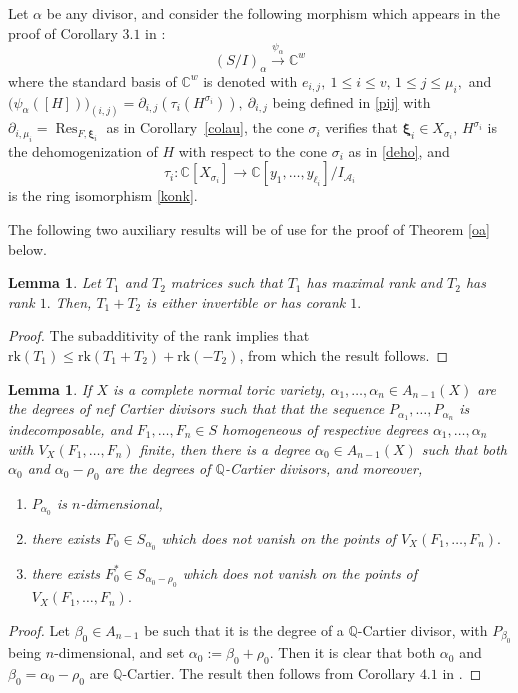 \documentclass[a4paper,11pt]{amsart}
\newcommand{\Res}{\operatorname{Res}}
\newcommand{\C}{\mathbb{C}}
\newcommand{\Q}{\mathbb{Q}}
\newcommand{\cA}{{\mathcal A}}
\newcommand{\bfxi}{{\boldsymbol{\xi}}}
\newcounter{thm}
\numberwithin{thm}{section}
\numberwithin{equation}{section}
\theoremstyle{definition}
\theoremstyle{plain}
\newtheorem{lemma}[thm]{Lemma}
\begin{document}
Let $\alpha$ be any divisor, and consider the following morphism which appears in the proof of Corollary $3.1$ in \cite{BT22}:
\begin{equation}\label{square}
 (S/I)_{\alpha}  \stackrel{\psi_\alpha}{\longrightarrow}
\C^w 
\end{equation}
where the standard basis of  $\C^w$ is denoted with $e_{i,j},\ 1\leq i\leq v,\, 1\leq j\leq \mu_i,$  and $\big(\psi_{\alpha}([H])\big)_{(i,j)}=\partial_{i,j}(\tau_i(H^{\sigma_ i})),\ \partial_{i,j}$ being defined in \eqref{pij} with $\partial_{i, \mu_i} = \Res_{F,\bfxi_i}$ as in Corollary~\ref{colau}, the cone $\sigma_i$ verifies that $\bfxi_i\in X_{\sigma_i},\, H^{\sigma_i}$ is the dehomogenization of $H$ with respect to the cone $\sigma_i$ as in \eqref{deho}, and
\begin{equation}\label{taui}
\tau_i:\C[X_{\sigma_i}]\to\C[y_1,\ldots, y_{\ell_i}]/ I_{\cA_i}
\end{equation} is the ring isomorphism  \eqref{konk}.

The following two auxiliary results will be of use for the proof of Theorem \ref{oa} below.


\begin{lemma}\label{haux}
Let $T_1$ and $T_2$ matrices such that $T_1$ has maximal rank and $T_2$ has rank $1.$ Then, $T_1+T_2$ is either invertible or has corank $1.$
\end{lemma}

\begin{proof}
The subadditivity of the rank implies that $\mbox{rk}(T_1)\leq \mbox{rk}(T_1+T_2)+\mbox{rk}(-T_2)$, from which the result follows.
\end{proof}



\begin{lemma}\label{hhaux}
If $X$ is a complete normal toric variety, $\alpha_1,\ldots, \alpha_n\in A_{n-1}(X)$ are the degrees of nef Cartier divisors such that that the sequence $P_{\alpha_1},\ldots, P_{\alpha_n}$ is indecomposable,  and $F_1,\ldots, F_n\in S$ homogeneous  of respective degrees $\alpha_1,\ldots, \alpha_n$ with $V_X(F_1,\ldots, F_n)$ finite, then there is a degree $\alpha_0\in A_{n-1}(X)$ such that both $\alpha_0$ and $\alpha_0-\rho_0$ are the degrees of $\Q$-Cartier divisors, and moreover,
\begin{enumerate}
\item $P_{\alpha_0}$ is $n$-dimensional,
\item there exists $F_0\in S_{\alpha_0}$ which does not vanish on the points of $V_X(F_1,\ldots, F_n).$
\item there exists $F^*_0\in S_{\alpha_0-\rho_0}$ which does not vanish on the points of $V_X(F_1,\ldots, F_n).$
\end{enumerate}
\end{lemma}
\begin{proof}
Let $\beta_0\in A_{n-1}$ be such that it is the degree of a $\Q$-Cartier divisor, with $P_{\beta_0}$ being $n$-dimensional, 
and set $\alpha_0:=\beta_0+\rho_0.$ Then it is clear that both $\alpha_0$ and $\beta_0=\alpha_0-\rho_0$ are $\Q$-Cartier. The result then follows from Corollary $4.1$ in \cite{BT22}.
\end{proof}
\end{document}
